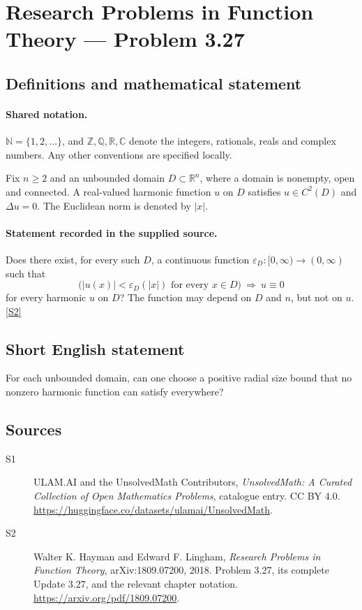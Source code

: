 \documentclass[11pt]{book}
\newcommand{\sref}[2]{\hyperlink{source:#1:#2}{[S#2]}}
\begin{document}
\section{Research Problems in Function Theory — Problem 3.27}\label{statement}

\subsection{Definitions and mathematical statement}

\paragraph{Shared notation.}$\mathbb N=\{1,2,\ldots\}$, and $\mathbb Z,\mathbb Q,\mathbb R,\mathbb C$ denote the integers, rationals, reals and complex numbers. Any other conventions are specified locally.


Fix $n\ge2$ and an unbounded domain $D\subset\mathbb R^n$, where a domain is nonempty, open and connected. A real-valued harmonic function $u$ on $D$ satisfies $u\in C^2(D)$ and $\Delta u=0$. The Euclidean norm is denoted by $|x|$.
\paragraph{Statement recorded in the supplied source.}
Does there exist, for every such $D$, a continuous function $\varepsilon_D:[0,\infty)\to(0,\infty)$ such that
\[\bigl(|u(x)|<\varepsilon_D(|x|)\text{ for every }x\in D\bigr)\ \Longrightarrow\ u\equiv0
\]
for every harmonic $u$ on $D$? The function may depend on $D$ and $n$, but not on $u$. \sref{statement}{2}
\subsection{Short English statement}
For each unbounded domain, can one choose a positive radial size bound that no nonzero harmonic function can satisfy everywhere?
\subsection{Sources}
\begin{description}
\item[\hypertarget{source:statement:1}{S1}] ULAM.AI and the UnsolvedMath Contributors, \emph{UnsolvedMath: A Curated Collection of Open Mathematics Problems}, catalogue entry. CC BY 4.0. \url{https://huggingface.co/datasets/ulamai/UnsolvedMath}.
\item[\hypertarget{source:statement:2}{S2}] Walter K. Hayman and Edward F. Lingham, \emph{Research Problems in Function Theory}, arXiv:1809.07200, 2018. Problem 3.27, its complete Update 3.27, and the relevant chapter notation. \url{https://arxiv.org/pdf/1809.07200}.
\end{description}
\label{end:statement}
\end{document}
